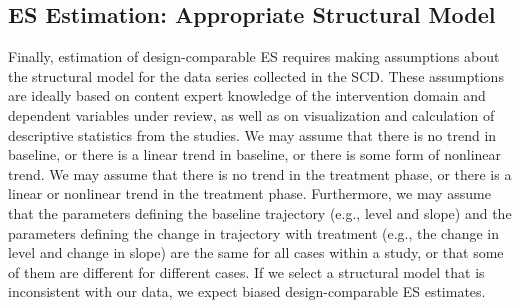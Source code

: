 \documentclass[
]{book}
\begin{document}
\hypertarget{es-estimation-appropriate-structural-model}{%
\subsection{ES Estimation: Appropriate Structural Model}\label{es-estimation-appropriate-structural-model}}

Finally, estimation of design-comparable ES requires making assumptions about the structural model for the data series collected in the SCD. These assumptions are ideally based on content expert knowledge of the intervention domain and dependent variables under review, as well as on visualization and calculation of descriptive statistics from the studies. We may assume that there is no trend in baseline, or there is a linear trend in baseline, or there is some form of nonlinear trend. We may assume that there is no trend in the treatment phase, or there is a linear or nonlinear trend in the treatment phase. Furthermore, we may assume that the parameters defining the baseline trajectory (e.g., level and slope) and the parameters defining the change in trajectory with treatment (e.g., the change in level and change in slope) are the same for all cases within a study, or that some of them are different for different cases. If we select a structural model that is inconsistent with our data, we expect biased design-comparable ES estimates.
\end{document}
